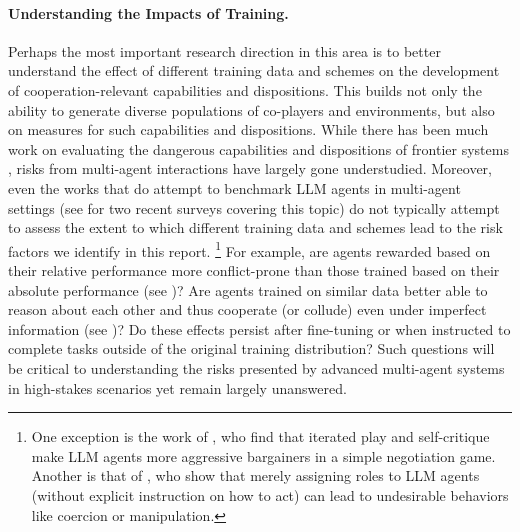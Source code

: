 \paragraph{Understanding the Impacts of Training.}
Perhaps the most important research direction in this area is to better {understand the effect of different training data and schemes} on the development of cooperation-relevant capabilities and dispositions.
This builds not only the ability to generate diverse populations of co-players and environments, but also on measures for such capabilities and dispositions.
While there has been much work on evaluating the dangerous capabilities and dispositions of frontier systems \citep{Ganguli2022-pa,kinniment2023evaluating,Pan2023-ww,Shevlane2023,perez2022discovering}, risks from multi-agent interactions have largely gone understudied.
Moreover, even the works that do attempt to benchmark LLM agents in multi-agent settings (see  \citet{zhang2024llm,feng2024survey} for two recent surveys covering this topic) do not typically attempt to assess the extent to which different training data and schemes lead to the risk factors we identify in this report.%
\footnote{One exception is the work of \citet{Fu2023-xi}, who find that iterated play and self-critique make LLM agents more aggressive bargainers in a simple negotiation game. Another is that of \citet{Campedelli2024}, who show that merely assigning roles to LLM agents (without explicit instruction on how to act) can lead to undesirable behaviors like coercion or manipulation.}
For example, are agents rewarded based on their relative performance more conflict-prone than those trained based on their absolute performance (see )?
Are agents trained on similar data better able to reason about each other and thus cooperate (or collude) even under imperfect information (see )?
Do these effects persist after fine-tuning or when instructed to complete tasks outside of the original training distribution?
Such questions will be critical to understanding the risks presented by advanced multi-agent systems in high-stakes scenarios yet remain largely unanswered.

